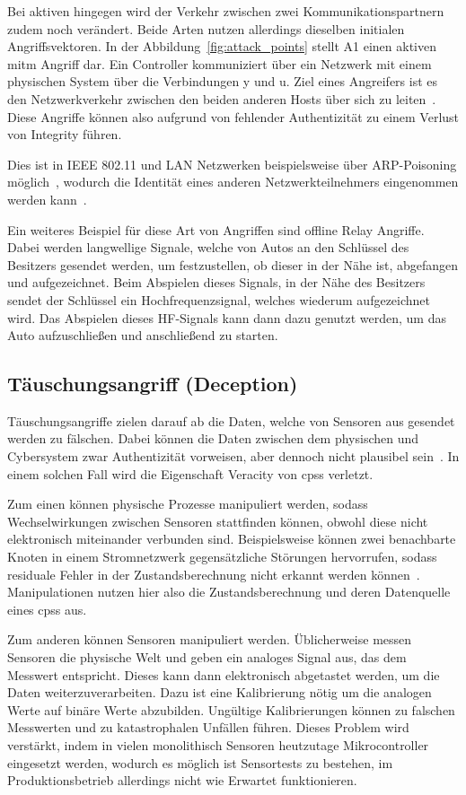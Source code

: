 \documentclass[final,bibliography=totocnumbered]{include/sikseminar}
\newcommand{\cps}{\glspl{cps}\xspace}
\begin{document}
Bei aktiven hingegen wird der Verkehr zwischen zwei Kommunikationspartnern zudem noch verändert.
Beide Arten nutzen allerdings dieselben initialen Angriffsvektoren.
In der Abbildung~\ref{fig:attack_points} stellt A1 einen aktiven \gls{mitm} Angriff dar.
Ein Controller kommuniziert über ein Netzwerk mit einem physischen System über die Verbindungen y und u.
Ziel eines Angreifers ist es den Netzwerkverkehr zwischen den beiden anderen Hosts über sich zu leiten~\cite{WYX+10,FPA+18}.
Diese Angriffe können also aufgrund von fehlender Authentizität zu einem Verlust von Integrity führen.

Dies ist in IEEE 802.11 und LAN Netzwerken beispielsweise über ARP-Poisoning möglich~\cite{FIT+12}, wodurch die Identität eines anderen Netzwerkteilnehmers eingenommen werden kann~\cite{RN05}.

Ein weiteres Beispiel für diese Art von Angriffen sind offline Relay Angriffe.
Dabei werden langwellige Signale, welche von Autos an den Schlüssel des Besitzers gesendet werden, um festzustellen, ob dieser in der Nähe ist, abgefangen und aufgezeichnet.
Beim Abspielen dieses Signals, in der Nähe des Besitzers sendet der Schlüssel ein Hochfrequenzsignal, welches wiederum aufgezeichnet wird.
Das Abspielen dieses HF-Signals kann dann dazu genutzt werden, um das Auto aufzuschließen und anschließend zu starten.~\cite{HLL+17}

\subsection{Täuschungsangriff (Deception)}\label{subsec:tauschung} %
Täuschungsangriffe zielen darauf ab die Daten, welche von Sensoren aus gesendet werden zu fälschen.
Dabei können die Daten zwischen dem physischen und Cybersystem zwar Authentizität vorweisen, aber dennoch nicht plausibel sein~\cite{SFJ17}.
In einem solchen Fall wird die Eigenschaft Veracity von \cps verletzt.

Zum einen können physische Prozesse manipuliert werden, sodass Wechselwirkungen zwischen Sensoren stattfinden können, obwohl diese nicht elektronisch miteinander verbunden sind.
Beispielsweise können zwei benachbarte Knoten in einem Stromnetzwerk gegensätzliche Störungen hervorrufen, sodass residuale Fehler in der Zustandsberechnung nicht erkannt werden können~\cite{KLG15}.
Manipulationen nutzen hier also die Zustandsberechnung und deren Datenquelle eines \cps aus.

Zum anderen können Sensoren manipuliert werden.
Üblicherweise messen Sensoren die physische Welt und geben ein analoges Signal aus, das dem Messwert entspricht.
Dieses kann dann elektronisch abgetastet werden, um die Daten weiterzuverarbeiten.
Dazu ist eine Kalibrierung nötig um die analogen Werte auf binäre Werte abzubilden.
Ungültige Kalibrierungen können zu falschen Messwerten und zu katastrophalen Unfällen führen.
Dieses Problem wird verstärkt, indem in vielen monolithisch Sensoren heutzutage Mikrocontroller eingesetzt werden, wodurch es möglich ist Sensortests zu bestehen, im Produktionsbetrieb allerdings nicht wie Erwartet funktionieren.~\cite{KLG15}
\end{document}
